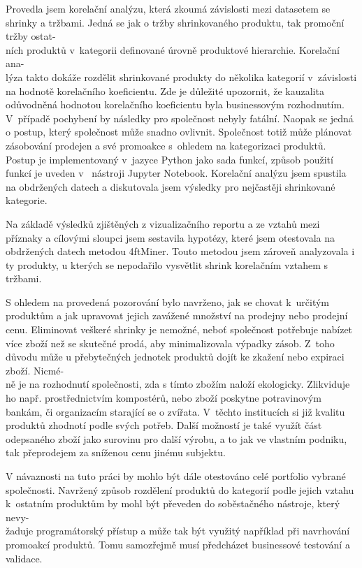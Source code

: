 
Provedla jsem korelační analýzu, která zkoumá závislosti mezi datasetem se shrinky a tržbami. Jedná se jak o tržby shrinkovaného produktu, tak promoční tržby ostat-\\ních produktů v~kategorii definované úrovně produktové hierarchie. Korelační ana-\\lýza takto dokáže rozdělit shrinkované produkty do několika kategorií v~závislosti na hodnotě korelačního koeficientu. Zde je důležité upozornit, že kauzalita odůvodněná hodnotou korelačního koeficientu byla businessovým rozhodnutím. V~případě pochybení by následky pro společnost nebyly fatální. Naopak se jedná o postup, který společnost může snadno ovlivnit. Společnost totiž může plánovat zásobování prodejen a své promoakce s~ohledem na kategorizaci produktů.
Postup je implementovaný v~jazyce Python jako sada funkcí, způsob použití funkcí je uveden v~ nástroji Jupyter Notebook. 
Korelační analýzu jsem spustila na obdržených datech a diskutovala jsem výsledky pro nejčastěji shrinkované kategorie.

Na základě výsledků zjištěných z vizualizačního reportu a ze vztahů mezi příznaky a cílovými sloupci jsem sestavila hypotézy, které jsem otestovala na obdržených datech metodou 4ftMiner. Touto metodou jsem zároveň analyzovala i ty produkty, u kterých se nepodařilo vysvětlit shrink korelačním vztahem s tržbami.

S ohledem  na provedená pozorování bylo navrženo, jak se chovat k~určitým produktům a jak upravovat jejich zavážené množství na prodejny nebo prodejní cenu. Eliminovat veškeré shrinky je nemožné, neboť společnost potřebuje nabízet více zboží než se skutečné prodá, aby minimalizovala výpadky zásob. Z~toho důvodu může u přebytečných jednotek produktů dojít ke zkažení nebo expiraci zboží. Nicmé-\\ně je na rozhodnutí společnosti, zda s tímto zbožím naloží ekologicky. Zlikviduje ho např. prostřednictvím kompostérů, nebo zboží poskytne potravinovým bankám, či organizacím starající se o zvířata. V~těchto institucích si již kvalitu produktů zhodnotí podle svých potřeb. Další možností je také využít část odepsaného zboží jako surovinu pro další výrobu, a to jak ve vlastním podniku, tak přeprodejem za sníženou cenu jinému subjektu.

V návaznosti na tuto práci by mohlo být dále otestováno celé portfolio vybrané společnosti.
Navržený způsob rozdělení produktů do kategorií podle jejich vztahu k~ostatním produktům by mohl být převeden do soběstačného nástroje, který nevy-\\žaduje programátorský přístup a může tak být využitý například při navrhování promoakcí produktů. Tomu samozřejmě musí předcházet businessové testování a validace.


